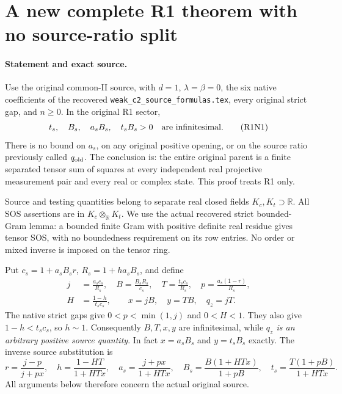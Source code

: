 \section{A new complete R1 theorem with no source-ratio split}
\label{sec:new-r1-all-tests}

\paragraph{Statement and exact source.}
Use the original common-II source, with $d=1$, $\lambda=\beta=0$,
the six native coefficients of the recovered
\texttt{weak\_c2\_source\_formulas.tex}, every original strict gap,
and $n\geq0$.  In the original R1 sector,
\[
 t_s,\quad B_s,\quad a_sB_s,\quad t_sB_s>0
 \quad\hbox{are infinitesimal}.                         \tag{R1N1}
\]
There is no bound on $a_s$, on any original positive opening, or on
the source ratio previously called $q_{\rm old}$.  The conclusion is:
the entire original parent is a finite separated tensor sum of
squares at every independent real projective measurement pair and
every real or complex state.  This proof treats R1 only.

Source and testing quantities belong to separate real closed fields
$K_c,K_t\supset\mathbb R$.  All SOS assertions are in
$K_c\otimes_{\mathbb R}K_t$.  We use the actual recovered strict
bounded-Gram lemma: a bounded finite Gram with positive definite
real residue gives tensor SOS, with no boundedness requirement on
its row entries.  No order or mixed inverse is imposed on the
tensor ring.

Put $c_s=1+a_sB_sr$, $R_s=1+ha_sB_s$, and define
\[
\begin{aligned}
 j&=\frac{a_sc_s}{R_s},\quad B=\frac{B_sR_s}{c_s},\quad
 T=\frac{t_sc_s}{R_s},\quad p=\frac{a_s(1-r)}{R_s},\\
 H&=\frac{1-h}{t_sc_s},\qquad x=jB,\quad y=TB,\quad q_z=jT.
\end{aligned}                                          \tag{R1N2}
\]
The native strict gaps give $0<p<\min(1,j)$ and $0<H<1$.
They also give $1-h<t_sc_s$, so $h\sim1$.
Consequently $B,T,x,y$ are infinitesimal, while
\emph{$q_z$ is an arbitrary positive source quantity}.
In fact $x=a_sB_s$ and $y=t_sB_s$ exactly.
The inverse source substitution is
\[
 r=\frac{j-p}{j+px},\quad h=\frac{1-HT}{1+HTx},\quad
 a_s=\frac{j+px}{1+HTx},\quad
 B_s=\frac{B(1+HTx)}{1+pB},\quad
 t_s=\frac{T(1+pB)}{1+HTx}.                             \tag{R1N3}
\]
All arguments below therefore concern the actual original source.


